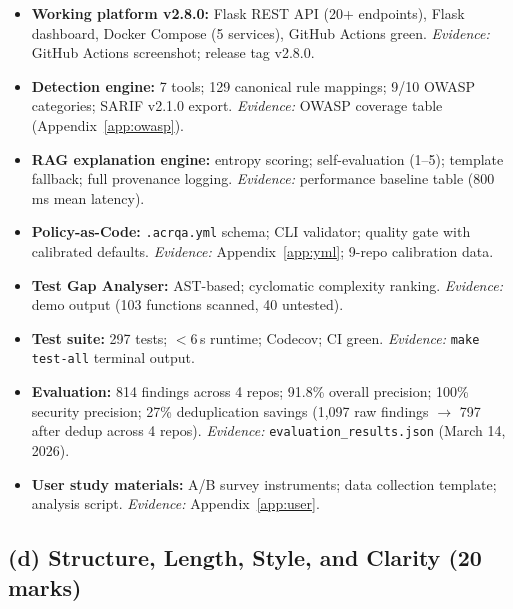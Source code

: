 \documentclass[12pt,a4paper]{article}
\begin{document}
\begin{itemize}[leftmargin=1.5em,itemsep=3pt]
  \item \textbf{Working platform v2.8.0:} Flask REST API (20+ endpoints), Flask
  dashboard, Docker Compose (5 services), GitHub Actions green.
  \emph{Evidence:} GitHub Actions screenshot; release tag v2.8.0.

  \item \textbf{Detection engine:} 7 tools; 129 canonical rule mappings; 9/10
  OWASP categories; SARIF v2.1.0 export.
  \emph{Evidence:} OWASP coverage table (Appendix~\ref{app:owasp}).

  \item \textbf{RAG explanation engine:} entropy scoring; self-evaluation (1--5);
  template fallback; full provenance logging.
  \emph{Evidence:} performance baseline table (800\,ms mean latency).

  \item \textbf{Policy-as-Code:} \texttt{.acrqa.yml} schema; CLI validator;
  quality gate with calibrated defaults.
  \emph{Evidence:} Appendix~\ref{app:yml}; 9-repo calibration data.

  \item \textbf{Test Gap Analyser:} AST-based; cyclomatic complexity ranking.
  \emph{Evidence:} demo output (103 functions scanned, 40 untested).

  \item \textbf{Test suite:} 297 tests; $<$6\,s runtime; Codecov; CI green.
  \emph{Evidence:} \texttt{make test-all} terminal output.

  \item \textbf{Evaluation:} 814 findings across 4 repos; 91.8\% overall
  precision; 100\% security precision; 27\% deduplication savings (1,097 raw
  findings $\to$ 797 after dedup across 4 repos).
  \emph{Evidence:} \texttt{evaluation\_results.json} (March 14, 2026).

  \item \textbf{User study materials:} A/B survey instruments; data collection
  template; analysis script.
  \emph{Evidence:} Appendix~\ref{app:user}.
\end{itemize}

\subsection{(d) Structure, Length, Style, and Clarity (20 marks)}
\end{document}
